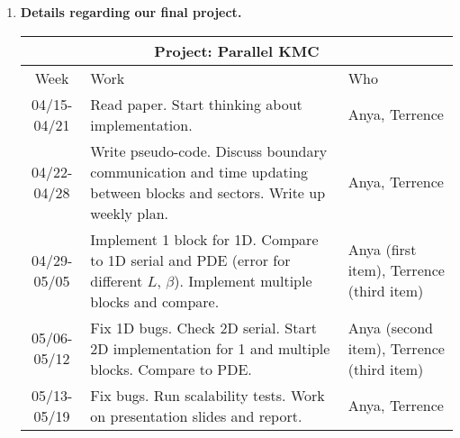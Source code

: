 \documentclass[12pt]{article}
\begin{document}
\begin{enumerate}
\item {\bf Details regarding our final project.}

  \begin{center}
  \begin{tabular} {|c|p{9cm}|p{2cm}|}
    \hline
    \multicolumn{3}{|c|}{\bf Project: Parallel KMC} \\
    \hline
    Week & Work & Who  \\ \hline \hline
    04/15-04/21 & Read paper.  Start thinking about
    implementation. & Anya, Terrence \\ \hline
    04/22-04/28 & Write pseudo-code.  Discuss boundary communication and time updating between blocks and sectors.
    Write up weekly plan. & Anya, Terrence \\ \hline
    04/29-05/05 & Implement 1 block for 1D.  Compare to 1D serial and PDE (error for different $L$, $\beta$). Implement multiple blocks and compare.  & Anya (first item), Terrence (third item)  \\ \hline
    05/06-05/12 & Fix 1D bugs.  Check 2D serial.  Start 2D implementation for 1 and multiple blocks.  Compare to PDE. & Anya (second item), Terrence (third item) \\ \hline
    05/13-05/19 & Fix bugs.  Run scalability tests. Work on
    presentation slides and report.  & Anya, Terrence \\ \hline
  \end{tabular}
  \end{center}



\end{enumerate}
\end{document}
